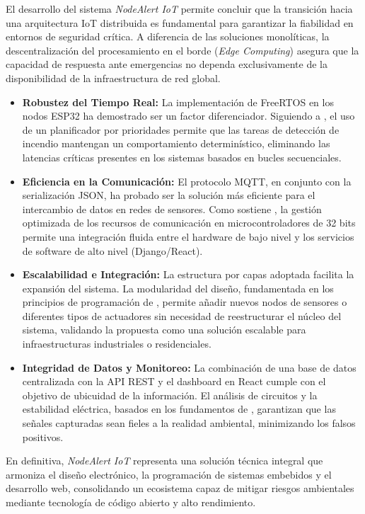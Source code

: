 
El desarrollo del sistema \textit{NodeAlert IoT} permite concluir que la transición hacia una arquitectura IoT distribuida es fundamental para garantizar la fiabilidad en entornos de seguridad crítica. A diferencia de las soluciones monolíticas, la descentralización del procesamiento en el borde (\textit{Edge Computing}) asegura que la capacidad de respuesta ante emergencias no dependa exclusivamente de la disponibilidad de la infraestructura de red global.

\begin{itemize}
    \item \textbf{Robustez del Tiempo Real:} La implementación de FreeRTOS en los nodos ESP32 ha demostrado ser un factor diferenciador. Siguiendo a \citet{valvano2014volume1}, el uso de un planificador por prioridades permite que las tareas de detección de incendio mantengan un comportamiento determinístico, eliminando las latencias críticas presentes en los sistemas basados en bucles secuenciales.
    \item \textbf{Eficiencia en la Comunicación:} El protocolo MQTT, en conjunto con la serialización JSON, ha probado ser la solución más eficiente para el intercambio de datos en redes de sensores. Como sostiene \citet{mazidi2014}, la gestión optimizada de los recursos de comunicación en microcontroladores de 32 bits permite una integración fluida entre el hardware de bajo nivel y los servicios de software de alto nivel (Django/React).
    \item \textbf{Escalabilidad e Integración:} La estructura por capas adoptada facilita la expansión del sistema. La modularidad del diseño, fundamentada en los principios de programación de \citet{deitel2004}, permite añadir nuevos nodos de sensores o diferentes tipos de actuadores sin necesidad de reestructurar el núcleo del sistema, validando la propuesta como una solución escalable para infraestructuras industriales o residenciales.
    \item \textbf{Integridad de Datos y Monitoreo:} La combinación de una base de datos centralizada con la API REST y el dashboard en React cumple con el objetivo de ubicuidad de la información. El análisis de circuitos y la estabilidad eléctrica, basados en los fundamentos de \citet{alexander2006}, garantizan que las señales capturadas sean fieles a la realidad ambiental, minimizando los falsos positivos.
\end{itemize}

En definitiva, \textit{NodeAlert IoT} representa una solución técnica integral que armoniza el diseño electrónico, la programación de sistemas embebidos y el desarrollo web, consolidando un ecosistema capaz de mitigar riesgos ambientales mediante tecnología de código abierto y alto rendimiento.